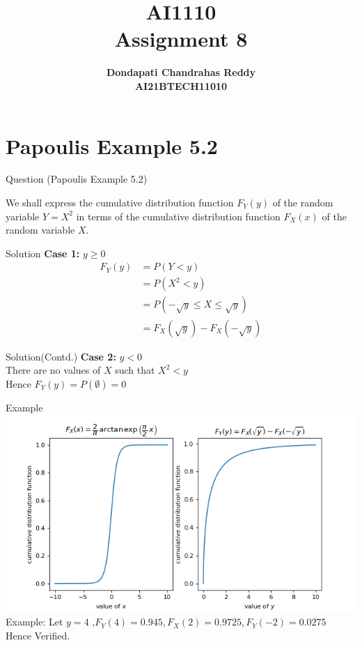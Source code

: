 \documentclass{beamer}
\title{\textbf{AI1110 \\ Assignment 8} }
\author{\textbf{Dondapati Chandrahas Reddy}\\\textbf{AI21BTECH11010}}
\begin{document}
	

\begin{frame}
	\titlepage 
\end{frame}


\section{Papoulis Example 5.2}
\begin{frame}{Question (Papoulis Example 5.2)}

We shall express the cumulative distribution function $F_Y(y)$ of the random yariable $Y = X^2$ in
terms of the cumulative distribution function $F_X(x)$ of the random variable $X$.

\end{frame}


\begin{frame}{Solution}
	\textbf{Case 1:} $y \geq 0$\\
	\begin{align}
		F_Y(y) &= P(Y < y)\\[1ex]
		&=P(X^2 < y)\\[1ex]
		&=P(-\sqrt{y} \leq X \leq \sqrt{y})\\[1ex]
		&=F_X(\sqrt{y})-F_X(-\sqrt{y})
	\end{align}
\end{frame}


\begin{frame}{Solution(Contd.)}
	\textbf{Case 2:} $y < 0$\\[1em]
	There are no values of $X$ such that $X^2 < y$\\[1ex]
	Hence $F_Y(y) = P(\emptyset) = 0$
\end{frame}


\begin{frame}{Example}
	\includegraphics[scale=0.595]{fig1.png}
	Example: Let $y =4$ ,$F_Y(4) = 0.945, F_X(2) = 0.9725, F_Y(-2) = 0.0275$\\
	Hence Verified.
\end{frame}
\end{document}
